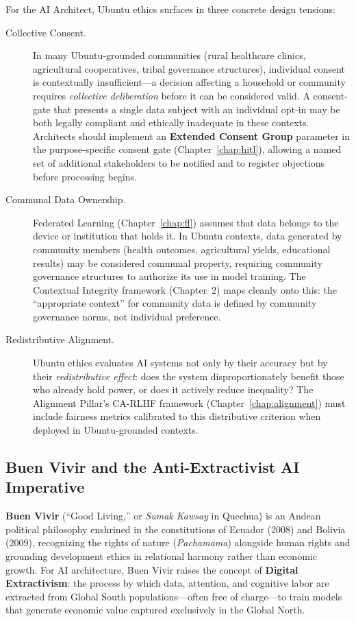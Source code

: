 For the AI Architect, Ubuntu ethics surfaces in three concrete design tensions:

\begin{description}
  \item[Collective Consent.] In many Ubuntu-grounded communities (rural healthcare clinics, agricultural cooperatives, tribal governance structures), individual consent is contextually insufficient---a decision affecting a household or community requires \emph{collective deliberation} before it can be considered valid. A consent-gate that presents a single data subject with an individual opt-in may be both legally compliant and ethically inadequate in these contexts. Architects should implement an \textbf{Extended Consent Group} parameter in the purpose-specific consent gate (Chapter~\ref{chap:hitl}), allowing a named set of additional stakeholders to be notified and to register objections before processing begins.
  \item[Communal Data Ownership.] Federated Learning (Chapter~\ref{chap:fl}) assumes that data belongs to the device or institution that holds it. In Ubuntu contexts, data generated by community members (health outcomes, agricultural yields, educational results) may be considered communal property, requiring community governance structures to authorize its use in model training. The Contextual Integrity framework (Chapter~2) maps cleanly onto this: the ``appropriate context'' for community data is defined by community governance norms, not individual preference.
  \item[Redistributive Alignment.] Ubuntu ethics evaluates AI systems not only by their accuracy but by their \emph{redistributive effect}: does the system disproportionately benefit those who already hold power, or does it actively reduce inequality? The Alignment Pillar's CA-RLHF framework (Chapter~\ref{chap:alignment}) must include fairness metrics calibrated to this distributive criterion when deployed in Ubuntu-grounded contexts.
\end{description}

\subsection{Buen Vivir and the Anti-Extractivist AI Imperative}
\label{subsec:buen_vivir}

\textbf{Buen Vivir} (``Good Living,'' or \textit{Sumak Kawsay} in Quechua) is an Andean political philosophy enshrined in the constitutions of Ecuador (2008) and Bolivia (2009), recognizing the rights of nature (\textit{Pachamama}) alongside human rights and grounding development ethics in relational harmony rather than economic growth. For AI architecture, Buen Vivir raises the concept of \textbf{Digital Extractivism}: the process by which data, attention, and cognitive labor are extracted from Global South populations---often free of charge---to train models that generate economic value captured exclusively in the Global North.

